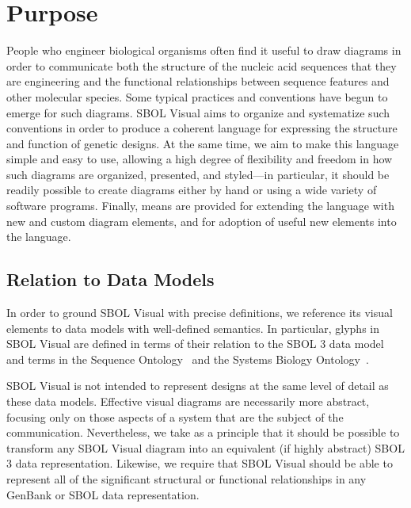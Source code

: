 \section{Purpose}

People who engineer biological organisms often find it useful to draw diagrams in order to
communicate both the structure of the nucleic acid sequences that they are engineering
and the functional relationships between sequence features and other molecular species.
%
Some typical practices and conventions have begun to emerge for such
diagrams.  SBOL Visual aims to organize and systematize such
conventions in order to produce a coherent language for expressing
the structure and function 
of genetic designs. 
%
At the same time, we aim to make this language simple and easy to use,
allowing a high degree of flexibility and freedom in how such diagrams are organized, presented, and
styled---in particular, it should be readily possible to create
diagrams either by hand or using a wide variety of software programs.
%
Finally, means are provided for extending the language with new and
custom diagram elements, and for adoption of useful new elements into
the language.

\subsection{Relation to Data Models}

In order to ground SBOL Visual with precise definitions, we reference its visual elements to data models with well-defined semantics.
In particular, glyphs in SBOL Visual are defined in terms of their relation to the SBOL 3 data model~\citep{SBOL3_0} and terms in the Sequence Ontology~\citep{SequenceOntology} and
the Systems Biology Ontology~\citep{SBO}.

SBOL Visual is not intended to represent designs at the same level of detail as these data models.
Effective visual diagrams are necessarily more abstract, focusing only on those aspects of a system that are the subject of the communication.
Nevertheless, we take as a principle that it should be possible to transform any SBOL Visual diagram into an equivalent (if highly abstract) SBOL 3 data representation.
Likewise, we require that SBOL Visual should be able to represent all of the significant structural or functional relationships in any GenBank or SBOL data representation.
